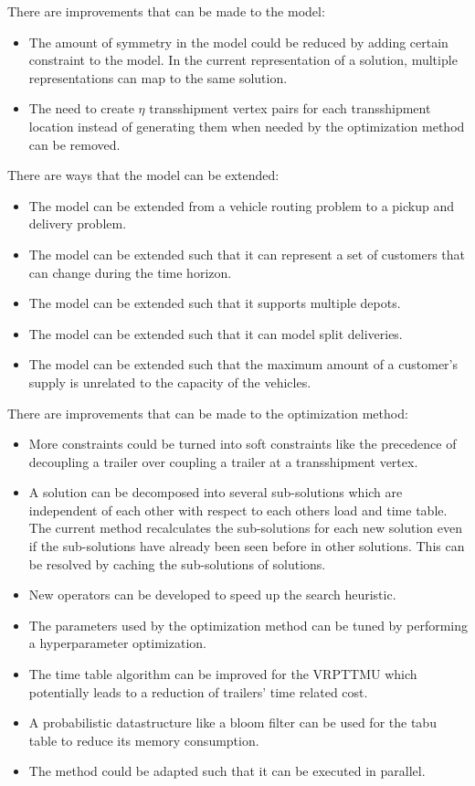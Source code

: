 There are improvements that can be made to the model:
\begin{itemize}
\item The amount of symmetry in the model could be reduced by adding certain constraint to the model.
In the current representation of a solution, multiple representations can map to the same solution.
\item The need to create $\eta$ transshipment vertex pairs for each transshipment location instead of generating them when needed by the optimization method can be removed.
\end{itemize}

There are ways that the model can be extended:
\begin{itemize}
  \item The model can be extended from a vehicle routing problem to a pickup and delivery problem.
  \item The model can be extended such that it can represent a set of customers that can change during the time horizon.
  \item The model can be extended such that it supports multiple depots.
  \item The model can be extended such that it can model split deliveries.
  \item The model can be extended such that the maximum amount of a customer's supply is  unrelated to the capacity of the vehicles.
\end{itemize}

There are improvements that can be made to the optimization method:
\begin{itemize}
\item More constraints could be turned into soft constraints like the precedence of decoupling a trailer over coupling a trailer at a transshipment vertex.
\item A solution can be decomposed into several sub-solutions which are independent of each other with respect to each others load and time table.
The current method recalculates the sub-solutions for each new solution even if the sub-solutions have already been seen before in other solutions.
This can be resolved by caching the sub-solutions of solutions.
\item New operators can be developed to speed up the search heuristic.
\item The parameters used by the optimization method can be tuned by performing a  hyperparameter optimization.
\item The time table algorithm can be improved for the VRPTTMU which potentially leads to a reduction of trailers' time related cost.
\item A probabilistic datastructure like a bloom filter can be used for the tabu table to reduce its memory consumption.
\item The method could be adapted such that it can be executed in parallel.
\end{itemize}

